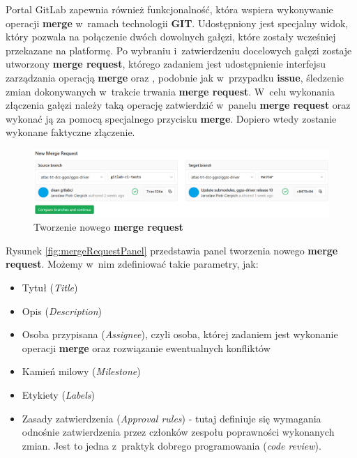 Portal GitLab zapewnia również funkcjonalność, która wspiera wykonywanie operacji \textbf{merge} w~ramach technologii \textbf{GIT}. Udostępniony jest specjalny widok, który pozwala na połączenie dwóch dowolnych gałęzi, które zostały wcześniej przekazane na platformę. Po wybraniu i~zatwierdzeniu docelowych gałęzi zostaje utworzony \textbf{merge request}, którego zadaniem jest udostępnienie interfejsu zarządzania operacją \textbf{merge} oraz , podobnie jak w~przypadku \textbf{issue}, śledzenie zmian dokonywanych w~trakcie trwania \textbf{merge request}. W~celu wykonania złączenia gałęzi należy taką operację zatwierdzić w~panelu \textbf{merge request} oraz wykonać ją za pomocą specjalnego przycisku \textbf{merge}. Dopiero wtedy zostanie wykonane faktyczne złączenie.\par

\begin{figure}[H]
\centering
\caption{Tworzenie nowego \textbf{merge request}}
\includegraphics[width=\textwidth]{res/png/newMergeRequest}
\end{figure}

Rysunek \ref{fig:mergeRequestPanel} przedstawia panel tworzenia nowego \textbf{merge request}. Możemy w~nim zdefiniować takie parametry, jak:
\begin{itemize}
\item Tytuł (\textit{Title})
\item Opis (\textit{Description})
\item Osoba przypisana (\textit{Assignee}), czyli osoba, której zadaniem jest wykonanie operacji \textbf{merge} oraz rozwiązanie ewentualnych konfliktów
\item Kamień milowy (\textit{Milestone})
\item Etykiety (\textit{Labels})
\item Zasady zatwierdzenia (\textit{Approval rules}) - tutaj definiuje się wymagania odnośnie zatwierdzenia przez członków zespołu poprawności wykonanych zmian. Jest to jedna z~praktyk dobrego programowania (\textit{code review}).
\end{itemize}

